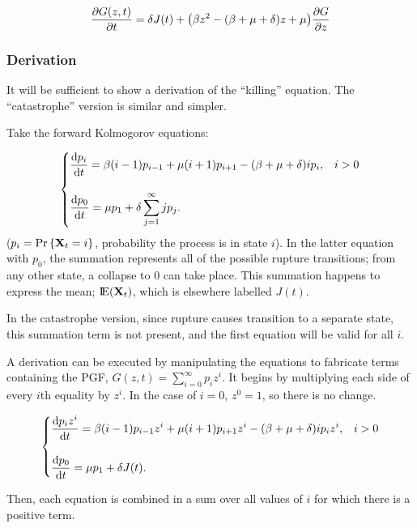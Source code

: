 \begin{equation}
\displaystyle\frac{\partial G(z,t)}{\partial t} = \delta J(t) +  \big(\beta z^2 - (\beta + \mu + \delta)z + \mu\big)\displaystyle\frac{\partial G}{\partial z}
\label{killEq1}
\end{equation}

\subsubsection*{Derivation}

It will be sufficient to show a derivation of the ``killing'' equation. The ``catastrophe'' version is similar and simpler. \par

Take the forward Kolmogorov equations: 

$$\begin{cases}
    \displaystyle\frac{{\rm d} p_i}{{\rm d} t} = \beta (i-1) p_{i-1} + \mu (i+1) p_{i+1} - (\beta + \mu + \delta)ip_i, & i > 0\\
   \\
    \displaystyle\frac{{\rm d} p_0}{{\rm d} t} = \mu p_1 +  \delta\sum^\infty_{j=1} jp_j.
\end{cases}$$
($p_i = {\text{Pr}\left\{{{\bf X}_t} = i\right\}}$, probability the process is in state $i$). In the latter equation with $p_0$, the summation represents all of the possible rupture transitions; from any other state, a collapse to 0 can take place. This summation happens to express the mean; ${\rm I}\!{\rm E}({{\bf X}_t})$, which is elsewhere labelled $J(t)$.\par 
In the catastrophe version, since rupture causes transition to a separate state, this summation term is not present, and the first equation will be valid for all $i$.\par
\vspace{10pt}

\noindent
A derivation can be executed by manipulating the equations to fabricate terms containing the PGF, $G(z, t) = \sum^\infty_{i=0}p_i z^i$. It begins by multiplying each side of every $i$th equality by $z^i$. In the case of $i=0$, $z^0 = 1$, so there is no change. 


$$\begin{cases}
    \displaystyle\frac{{\rm d} p_iz^i}{{\rm d} t} = \beta (i-1) p_{i-1}z^i + \mu (i+1) p_{i+1}z^i - (\beta + \mu + \delta)ip_iz^i, & i > 0\\
   \\
    \displaystyle\frac{{\rm d} p_0}{{\rm d} t} = \mu p_1 +  \delta J(t).
\end{cases}$$

\noindent
Then, each equation is combined in a sum over all values of $i$ for which there is a positive term.

